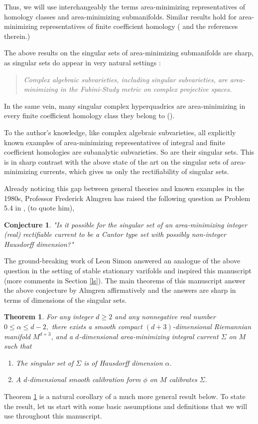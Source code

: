 \documentclass[11pt,a4paper]{amsart}
\numberwithin{equation}{section}
\newcommand{\ai}{\alpha}
\newcommand{\Si}{\Sigma}
\theoremstyle{plain}
\newtheorem{thm}{Theorem}
\theoremstyle{definition}
\newtheorem{conj}{Conjecture}
\numberwithin{equation}{subsection}
\begin{document}
  Thus, we will use interchangeably the terms area-minimizing representatives of homology classes and area-minimizing submanifolds. Similar results hold for area-minimizing representatives of finite coefficient homology (\cite{DMSmod,LScy} and the references therein.)
	
	The above results on the singular sets of area-minimizing submanifolds are sharp, as singular sets do appear in very natural settings \cite[Section 4]{MR0168727}:
	\begin{quote}
		\emph{Complex algebraic subvarieties, including singular subvarieties, are area-minimizing in the Fubini-Study metric on complex projective spaces.}
	\end{quote}
In the same vein, many singular complex hyperquadrics are area-minimizing in every finite coefficient homology class they belong to (\cite{FMcalv}). 

To the author's knowledge, like complex algebraic subvarieties, all explicitly known examples of area-minimizing representatives of integral and finite coefficient homologies are subanalytic subvarieties. So are their singular sets. This is in sharp contrast with the above state of the art on the singular sets of area-minimizing currents, which gives us only the rectifiability of singular sets. 


Already noticing this gap between general theories and known examples in the 1980s, Professor Frederick Almgren has raised the following question as Problem 5.4 in \cite{GMT}, (to quote him), 
\begin{conj}\label{ca}
		\emph{"Is it possible for the singular set of an area-minimizing integer (real) rectifiable current to be a Cantor type set with possibly non-integer Hausdorff dimension?"}
	\end{conj}
The ground-breaking work of Leon Simon \cite{LSfr} answered an analogue of the above question in the setting of stable stationary varifolds and inspired this manuscript (more comments in Section \ref{ls}). The main theorems of this manuscript answer the above conjecture by Almgren affirmatively and the answers are sharp in terms of dimensions of the singular sets.
\begin{thm}\label{thmd}
	For any integer $d\ge 2$ and any nonnegative real number $0\le\ai\le d-2,$ there exists a smooth compact $(d+3)$-dimensional Riemannian manifold $M^{d+3}$, and  a $d$-dimensional area-minimizing integral current $\Si$ on $M$ such that
\begin{enumerate}
\item The singular set of $\Si$ is of Hausdorff dimension $\ai$.
\item A $d$-dimensional smooth calibration form $\phi$ on $M$ calibrates $\Si.$
\end{enumerate}
\end{thm}
Theorem \ref{thmd} is a natural corollary of a much more general result below. To state the result, let us start with some basic assumptions and definitions that we will use throughout this manuscript.
\end{document}
